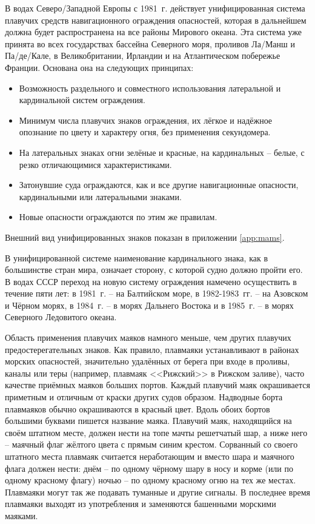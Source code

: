 В водах Северо\-/Западной Европы с 1981~г. действует унифицированная
система плавучих средств навигационного ограждения опасностей, которая
в дальнейшем должна будет распространена на все районы Мирового
океана. Эта система уже принята во всех государствах бассейна
Северного моря, проливов Ла\-/Манш и Па\-/де\-/Кале, в Великобритании,
Ирландии и на Атлантическом побережье Франции. Основана она на
следующих принципах:

\begin{itemize}
\item Возможность раздельного и совместного использования латеральной
  и кардинальной систем ограждения.
\item Минимум числа плавучих знаков ограждения, их лёгкое и надёжное
  опознание по цвету и характеру огня, без применения секундомера.
\item На латеральных знаках огни зелёные и красные, на кардинальных
  \--- белые, с резко отличающимися характеристиками.
\item Затонувшие суда ограждаются, как и все другие навигационные
  опасности, кардинальными или латеральными знаками.
\item Новые опасности ограждаются по этим же правилам.  
\end{itemize}

Внешний вид унифицированных знаков показан в приложении
\ref{app:mams}.

В унифицированной системе наименование кардинального знака, как в
большинстве стран мира, означает сторону, с которой судно должно
пройти его. В водах СССР переход на новую систему ограждения намечено
осуществить в течение пяти лет: в 1981~г. \--- на Балтийском море, в
1982-1983~гг. \--- на Азовском и Чёрном морях, в 1984~г. \--- в морях
Дальнего Востока и в 1985~г. \--- в морях Северного Ледовитого океана.

Область применения плавучих маяков намного меньше, чем других плавучих
предостерегательных знаков. Как правило, плавмаяки устанавливают в
районах морских опасностей, значительно удалённых от берега при входе
в проливы, каналы или теры (например, плавмаяк <<Рижский>> в Рижском
заливе), часто качестве приёмных маяков больших портов. Каждый
плавучий маяк окрашивается приметным и отличным от краски других судов
образом. Надводные борта плавмаяков обычно окрашиваются в красный
цвет. Вдоль обоих бортов большими буквами пишется название
маяка. Плавучий маяк, находящийся на своём штатном месте, должен нести
на топе мачты решетчатый шар, а ниже него \--- маячный флаг жёлтого
цвета с прямым синим крестом. Сорванный со своего штатного места
плавмаяк считается неработающим и вместо шара и маячного флага должен
нести: днём \--- по одному чёрному шару в носу и корме (или по одному
красному флагу) ночью \--- по одному красному огню на тех же
местах. Плавмаяки могут так же подавать туманные и другие сигналы. В
последнее время плавмаяки выходят из употребления и заменяются
башенными морскими маяками.

